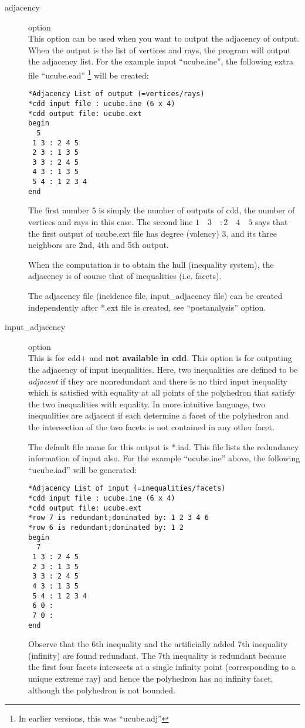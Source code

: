 \documentclass[11pt]{article}
\begin{document}
\begin{description}
\item[adjacency] option\\
This option can be used when you want to output the adjacency of output.
When the output is the list of vertices and rays, the program will
output the adjacency list.  For the example input ``ucube.ine'',
the following extra file  ``ucube.ead''  \footnote{In earlier versions,
this was ``ucube.adj''}  will be created:
\begin{verbatim}
*Adjacency List of output (=vertices/rays)
*cdd input file : ucube.ine (6 x 4)
*cdd output file: ucube.ext
begin
  5
 1 3 : 2 4 5
 2 3 : 1 3 5
 3 3 : 2 4 5
 4 3 : 1 3 5
 5 4 : 1 2 3 4
end
\end{verbatim}
The first number $5$ is simply the number of outputs of cdd, the
number of vertices and rays in this case.
The second line $ 1 \quad  3 \quad : 2 \quad  4 \quad  5$ says 
that the first output of
ucube.ext file has degree (valency) $3$, and its three neighbors are
2nd, 4th and 5th output.

When the computation is to obtain the hull (inequality system),
the adjacency is of course that of inequalities (i.e. facets).

The adjacency file (incidence file, input\_adjacency file) 
can be created independently
after *.ext file is created, see ``postanalysis'' option.

\item[input\_adjacency] option\\
This is for cdd+ and {\bf not available in cdd\/}.
This option is for outputing the adjacency of input inequalities.
Here, two inequalities are defined to be {\em adjacent\/} if 
they are nonredundant and there is no third input inequality
which is satisfied with equality at all points of the polyhedron
that satisfy the two inequalities with equality. 
In more intuitive language, two inequalities are adjacent
if each determine a facet of the polyhedron and the intersection
of the two facets is not contained in any other facet.

The default file name for this output is *.iad.  This file
lists the redundancy information of input also.  For the example
``ucube.ine'' above, the following ``ucube.iad'' will
be generated:
\begin{verbatim}
*Adjacency List of input (=inequalities/facets)
*cdd input file : ucube.ine (6 x 4)
*cdd output file: ucube.ext
*row 7 is redundant;dominated by: 1 2 3 4 6
*row 6 is redundant;dominated by: 1 2
begin
  7
 1 3 : 2 4 5
 2 3 : 1 3 5
 3 3 : 2 4 5
 4 3 : 1 3 5
 5 4 : 1 2 3 4
 6 0 :
 7 0 :
end
\end{verbatim}
Observe that the 6th inequality and the 
artificially added 7th inequality (infinity)
are found redundant.  The 7th inequality is redundant
because the first four facets intersects at
a single infinity point (corresponding to a unique extreme ray)
and hence the polyhedron has no infinity facet,
although the polyhedron is not bounded.


\end{description}
\end{document}
